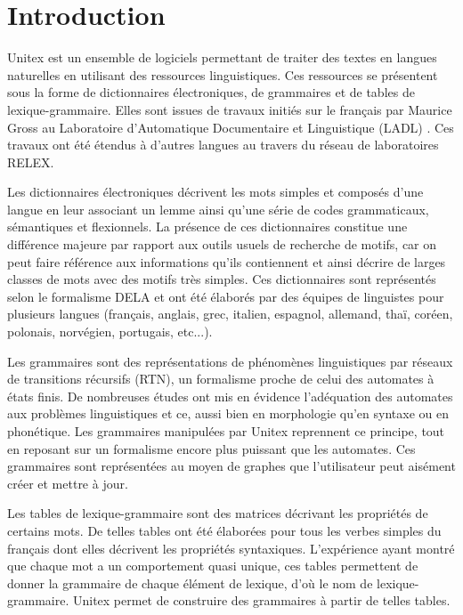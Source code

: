 \chapter*{Introduction}

Unitex est un ensemble de logiciels permettant de traiter des textes en langues naturelles en
utilisant des ressources linguistiques. Ces ressources se présentent sous la forme de dictionnaires
électroniques, de grammaires et de tables de lexique-grammaire. Elles sont issues de travaux initiés
sur le français par Maurice Gross au Laboratoire d’Automatique Documentaire et Linguistique (LADL)
.  Ces travaux ont été étendus à d’autres langues au travers du réseau de laboratoires
RELEX.

\bigskip
\noindent Les dictionnaires électroniques décrivent les mots simples et composés d’une langue en
leur associant un lemme ainsi qu’une série de codes grammaticaux, sémantiques et flexionnels. La présence de ces dictionnaires constitue une différence majeure par rapport aux outils
usuels de recherche de motifs, car on peut faire référence aux informations qu’ils contiennent
et ainsi décrire de larges classes de mots avec des motifs très simples. Ces dictionnaires sont
représentés selon le formalisme DELA et ont été élaborés par des équipes de linguistes pour
plusieurs langues (français, anglais, grec, italien, espagnol, allemand, thaï, coréen, polonais,
norvégien, portugais, etc...).


\bigskip
\noindent Les grammaires sont des représentations de phénomènes linguistiques par réseaux de
transitions récursifs (RTN), un formalisme proche de celui des automates à états finis. De
nombreuses études ont mis en évidence l’adéquation des automates aux problèmes linguistiques et ce,
aussi bien en morphologie qu’en syntaxe ou en phonétique. Les grammaires manipulées par Unitex
reprennent ce principe, tout en reposant sur un formalisme encore plus puissant que les automates.
Ces grammaires sont représentées au moyen de graphes que l’utilisateur peut aisément créer et
mettre à jour.

\bigskip
\noindent Les tables de lexique-grammaire sont des matrices décrivant les propriétés de certains
mots. De telles tables ont été élaborées pour tous les verbes simples du français dont elles
décrivent les propriétés syntaxiques. L’expérience ayant montré que chaque mot a un comportement
quasi unique, ces tables permettent de donner la grammaire de chaque élément de lexique, d’où le nom
de lexique-grammaire. Unitex permet de construire des grammaires à partir de telles tables.


